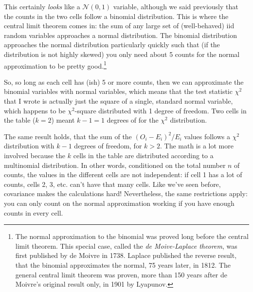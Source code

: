 \documentclass{book}
\begin{document}
This certainly \emph{looks} like a $\mathcal{N}(0, 1)$ variable, although we
said previously that the counts in the two cells follow a binomial
distribution. This is where the central limit theorem comes in: the sum of any
large set of (well-behaved) iid random variables approaches a normal
distribution. The binomial distribution approaches the normal distribution
particularly quickly such that (if the distribution is not highly skewed) you
only need about 5 counts for the normal approximation to be pretty
good.\footnote{The normal approximation to the binomial was proved long before
the central limit theorem. This special case, called the \emph{de Moive-Laplace 
theorem}, was first published by de Moivre in 1738. Laplace published
the reverse result, that the binomial approximates the normal, 75 years later,
in 1812. The general central limit theorem was proven, more than 150 years
after de Moivre's original result only, in 1901 by Lyapunov.}

So, so long as each cell has (ish) 5 or more counts, then we can approximate
the binomial variables with normal variables, which means that the test
statistic $\chi^2$ that I wrote is actually just the square of a single,
standard normal variable, which happens to be $\chi^2$-square distributed with
1 degree of freedom. Two cells in the table ($k=2$) meant $k-1=1$ degrees of
for the $\chi^2$ distribution.

The same result holds, that the sum of the $(O_i - E_i)^2/E_i$ values follows
a $\chi^2$ distribution with $k-1$ degrees of freedom, for $k>2$. The math is
a lot more involved because the $k$ cells in the table are distributed
according to a multinomial distribution. In other words, conditioned on the
total number $n$ of counts, the values in the different cells are not
independent: if cell 1 has a lot of counts, cells 2, 3, etc. can't have that
many cells. Like we've seen before, covariance makes the calculations hard!
Nevertheless, the same restrictions apply: you can only count on the normal
approximation working if you have enough counts in every cell.
\end{document}
